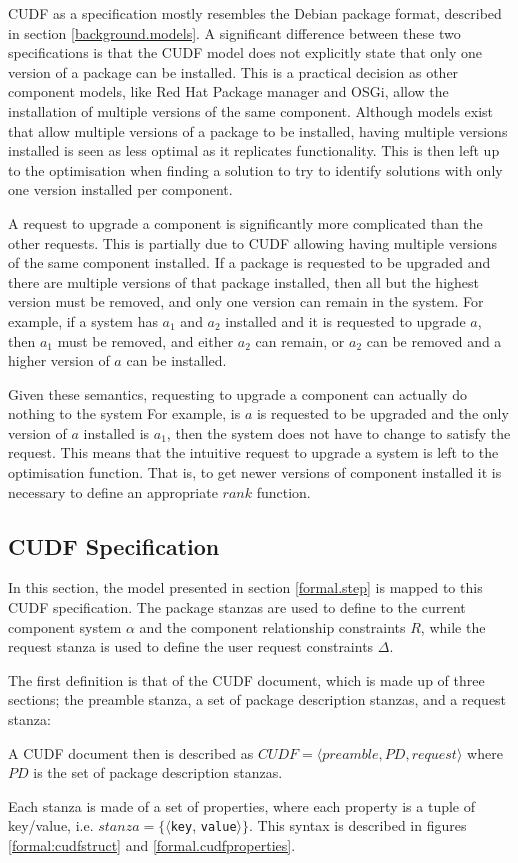 CUDF as a specification mostly resembles the Debian package format, described in section \ref{background.models}.
A significant difference between these two specifications is that the CUDF model does not explicitly state that only one version of a package can be installed.
This is a practical decision as other component models, like Red Hat Package manager and OSGi, allow the installation of multiple versions of the same component.
Although models exist that allow multiple versions of a package to be installed, having multiple versions installed is seen as less optimal as it replicates functionality. 
This is then left up to the optimisation when finding a solution to try to identify solutions with only one version installed per component.

A request to upgrade a component is significantly more complicated than the other requests.
This is partially due to CUDF allowing having multiple versions of the same component installed.
If a package is requested to be upgraded and there are multiple versions of that package installed,
then all but the highest version must be removed, and only one version can remain in the system.
For example, if a system has $a_1$ and $a_2$ installed and it is requested to upgrade $a$,
then $a_1$ must be removed, and either $a_2$ can remain, or $a_2$ can be removed and a higher version of $a$ can be installed.

Given these semantics, requesting to upgrade a component can actually do nothing to the system
For example, is $a$ is requested to be upgraded and the only version of $a$ installed is $a_1$, then the system does not have to change to satisfy the request.
This means that the intuitive request to upgrade a system is left to the optimisation function.
That is, to get newer versions of component installed it is necessary to define an appropriate $rank$ function.

\subsection{CUDF Specification}
In this section, the model presented in section \ref{formal.step} is mapped to this CUDF specification.
The package stanzas are used to define to the current component system $\alpha$ and the component relationship constraints $R$, 
while the request stanza is used to define the user request constraints $\Delta$. 

The first definition is that of the CUDF document, which is made up of three sections; the preamble stanza, a set of package description stanzas, and a request stanza:
\begin{defs}
A CUDF document then is described as $CUDF = \langle preamble, PD, request \rangle$ where $PD$ is the set of package description stanzas.
\end{defs} 
Each stanza is made of a set of properties, where each property is a tuple of key/value, i.e. $stanza = \{\langle $\verb+key+, \verb+value+$\rangle\}$.
This syntax is described in figures \ref{formal:cudfstruct} and \ref{formal.cudfproperties}.

